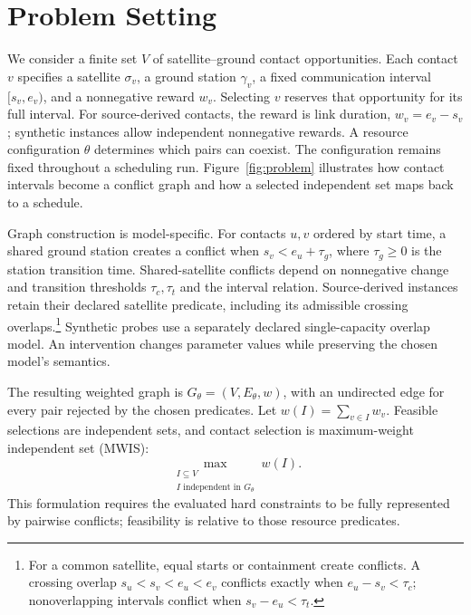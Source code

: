 \section{Problem Setting}
\label{sec:problem}

We consider a finite set $V$ of satellite--ground contact opportunities.
Each contact $v$ specifies a satellite $\sigma_v$, a ground station
$\gamma_v$, a fixed communication interval $[s_v,e_v)$, and a nonnegative
reward $w_v$. Selecting $v$ reserves that opportunity for its full interval.
For source-derived contacts, the reward is link duration,
$w_v=e_v-s_v$; synthetic instances allow independent nonnegative rewards.
A resource configuration $\theta$ determines which pairs can coexist.
The configuration remains fixed throughout a scheduling run.
Figure~\ref{fig:problem} illustrates how contact intervals become a
conflict graph and how a selected independent set maps back to a schedule.

Graph construction is model-specific. For contacts $u,v$ ordered by start
time, a shared ground station creates a conflict when $s_v<e_u+\tau_g$,
where $\tau_g\geq0$ is the station transition time.
Shared-satellite conflicts depend on nonnegative change and transition
thresholds $\tau_c,\tau_t$ and the interval relation.
Source-derived instances retain their declared satellite predicate,
including its admissible crossing overlaps.\footnote{For a common satellite,
equal starts or containment create conflicts. A crossing overlap
$s_u<s_v<e_u<e_v$ conflicts exactly when $e_u-s_v<\tau_c$;
nonoverlapping intervals conflict when $s_v-e_u<\tau_t$.}
Synthetic probes use a separately declared single-capacity overlap model.
An intervention changes parameter values while preserving the chosen
model's semantics.

The resulting weighted graph is $G_\theta=(V,E_\theta,w)$, with an
undirected edge for every pair rejected by the chosen predicates.
Let $w(I)=\sum_{v\in I}w_v$. Feasible selections are independent sets,
and contact selection is maximum-weight independent set (MWIS):
\begin{equation}
 \max_{\substack{I\subseteq V\\
                 I\text{ independent in }G_\theta}}w(I).
 \label{eq:mwis}
\end{equation}
This formulation requires the evaluated hard constraints to be fully
represented by pairwise conflicts; feasibility is relative to those
resource predicates.

